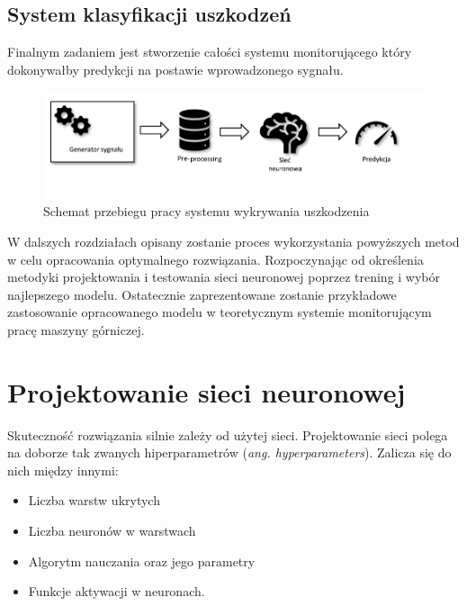 \documentclass[inzynierska]{pwr_wmat_praca_dyplomowa}
\theoremstyle{plain}
\numberwithin{theorem}{chapter}
\theoremstyle{definition}
\numberwithin{theorem}{chapter}
\begin{document}
\section{System klasyfikacji uszkodzeń}
Finalnym zadaniem jest stworzenie całości systemu monitorującego który dokonywałby predykcji na postawie wprowadzonego sygnału. 
\begin{figure}[ht]
	\centering
	\includegraphics[width=14cm]{images/workflow_c.pdf}
	\caption{Schemat przebiegu pracy systemu wykrywania uszkodzenia}
	\label{proces-koncowy}
\end{figure}

W dalszych rozdziałach opisany zostanie proces wykorzystania powyższych metod w celu opracowania optymalnego rozwiązania. Rozpoczynając od określenia metodyki projektowania i testowania sieci neuronowej poprzez trening i wybór najlepszego modelu. Ostatecznie zaprezentowane zostanie przykładowe zastosowanie opracowanego modelu w teoretycznym systemie monitorującym pracę maszyny górniczej. 










\chapter{Projektowanie sieci neuronowej}
Skuteczność rozwiązania silnie zależy od użytej sieci. Projektowanie sieci polega na doborze tak zwanych hiperparametrów (\textit{ang. hyperparameters}). Zalicza się do nich między innymi:
\begin{itemize}
	\item Liczba warstw ukrytych
	\item Liczba neuronów w warstwach
	\item Algorytm nauczania oraz jego parametry
	\item Funkcje aktywacji w neuronach.
\end{itemize}
\end{document}
